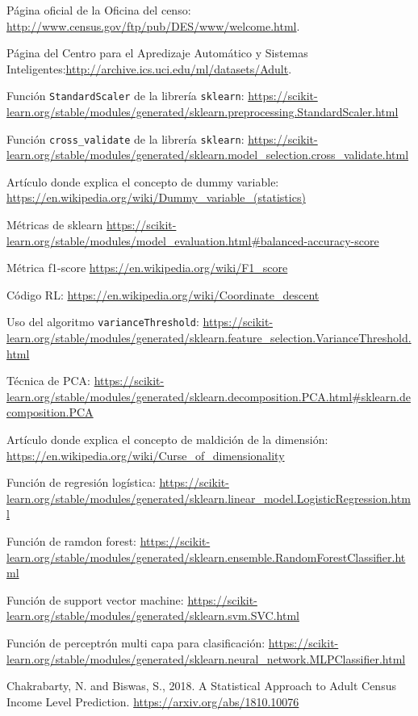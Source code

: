 \documentclass[11pt,a4paper]{article}
\begin{document}
\newpage
\begin{thebibliography}{9}
Página oficial de la Oficina del censo: \url{http://www.census.gov/ftp/pub/DES/www/welcome.html}.

Página del Centro para el Apredizaje Automático y Sistemas Inteligentes:\url{http://archive.ics.uci.edu/ml/datasets/Adult}.

Función \texttt{StandardScaler} de la librería \texttt{sklearn}: \url{https://scikit-learn.org/stable/modules/generated/sklearn.preprocessing.StandardScaler.html}

Función \texttt{cross\_validate} de la librería \texttt{sklearn}:
\url{https://scikit-learn.org/stable/modules/generated/sklearn.model_selection.cross_validate.html}

Artículo donde explica el concepto de dummy variable: \url{https://en.wikipedia.org/wiki/Dummy_variable_(statistics)}

Métricas de sklearn \url{https://scikit-learn.org/stable/modules/model_evaluation.html#balanced-accuracy-score}


Métrica f1-score \url{https://en.wikipedia.org/wiki/F1_score}


Código RL: \url{https://en.wikipedia.org/wiki/Coordinate_descent}


Uso del algoritmo \texttt{varianceThreshold}: \url{https://scikit-learn.org/stable/modules/generated/sklearn.feature_selection.VarianceThreshold.html}

Técnica de PCA: 
\url{https://scikit-learn.org/stable/modules/generated/sklearn.decomposition.PCA.html#sklearn.decomposition.PCA}

Artículo donde explica el concepto de maldición de la dimensión: \url{https://en.wikipedia.org/wiki/Curse_of_dimensionality}

Función de regresión logística:
\url{https://scikit-learn.org/stable/modules/generated/sklearn.linear_model.LogisticRegression.html}

Función de ramdon forest:
\url{https://scikit-learn.org/stable/modules/generated/sklearn.ensemble.RandomForestClassifier.html}

Función de support vector machine:
\url{https://scikit-learn.org/stable/modules/generated/sklearn.svm.SVC.html}

Función de perceptrón multi capa para clasificación:
\url{https://scikit-learn.org/stable/modules/generated/sklearn.neural_network.MLPClassifier.html}

Chakrabarty, N. and Biswas, S., 2018. A Statistical Approach to Adult Census Income Level Prediction.
\url{https://arxiv.org/abs/1810.10076}

\end{thebibliography}
\end{document}
